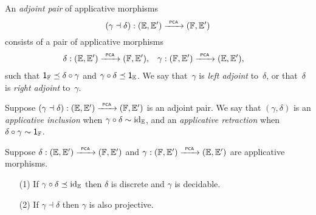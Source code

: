 \begin{definition}
  \cite[Definition 2.5.1]{Longley:94}
  An \emph{adjoint pair} of applicative morphisms
  \begin{equation*}
    (\gamma \dashv \delta): (\EE, \subEE) \pcato (\FF, \subFF)
  \end{equation*}
  consists of a pair of applicative morphisms
  \begin{align*}
    \delta &: (\EE, \subEE) \pcato (\FF, \subFF),
    &
    \gamma &: (\FF, \subFF) \pcato (\EE, \subEE),
  \end{align*}
  such that $\one_{\FF} \preceq \delta \circ \gamma$ and $\gamma \circ
  \delta \preceq \one_{\EE}$. We say that~$\gamma$ is \emph{left
    adjoint} to~$\delta$, or that~$\delta$ is \emph{right adjoint}
  to~$\gamma$.
\end{definition}


\begin{definition}
  \cite[Definition 2.5.2]{Longley:94}
  Suppose $(\gamma \dashv
  \delta): (\EE, \subEE) \pcato (\FF, \subFF)$ is an adjoint pair.
  We say that $(\gamma, \delta)$ is an \emph{applicative inclusion}
  when $\gamma \circ \delta \sim \id[\EE]$, and an \emph{applicative
    retraction} when $\delta \circ \gamma \sim \one_\FF$.
\end{definition}


\begin{theorem}
  \label{th:applicative_morphisms_properties2}%
  \textnormal{\cite[Theorem 2.5.3]{Longley:94}}
  Suppose $\delta: (\EE, \subEE) \pcato (\FF, \subFF)$ and
  $\gamma: (\FF, \subFF) \pcato (\EE, \subEE)$ are applicative
  morphisms.
  \begin{enumerate}
  \item[(1)]
    If $\gamma \circ \delta \preceq \id[\EE]$ then $\delta$ is discrete 
    and $\gamma$ is decidable.
  \item[(2)]
    If $\gamma \dashv \delta$ then $\gamma$ is also projective.
  \end{enumerate}
\end{theorem}

